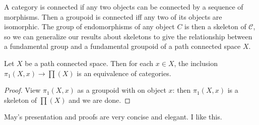 A category is connected if any two objects can be connected by a sequence of morphisms. Then a groupoid is connected iff any two of its objects are isomorphic. The group of endomorphisms of any object $C$ is then a skeleton of $\mathcal{C} $, so we can generalize our results about skeletons to give the relationship between a fundamental group and a fundamental groupoid of a path connected space $X$.
\begin{prop}
    Let $X$ be a path connected space. Then for each $x\in X$, the inclusion $\pi_1(X,x) \to \prod (X)$ is an equivalence of categories.
\end{prop}
\begin{proof}
    View $\pi_1(X,x)$ as a groupoid with on object $x$: then $\pi_1(X,x)$ is a skeleton of $\prod (X)$ and we are done.
\end{proof}
May's presentation and proofs are very concise and elegant. I like this.



